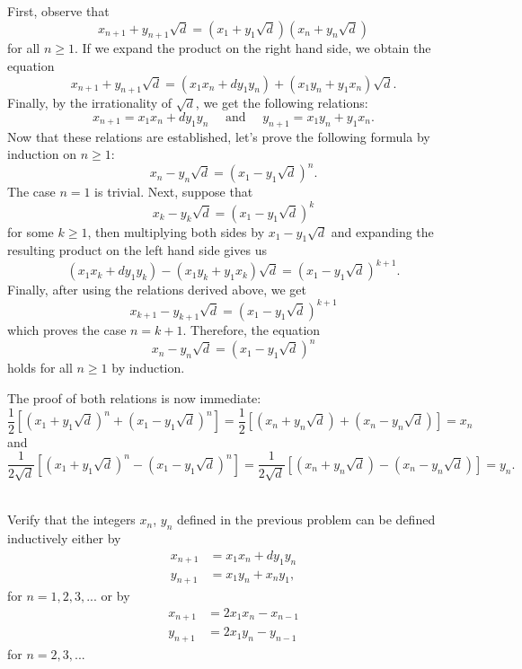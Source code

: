 \begin{solution}
    First, observe that
    $$x_{n+1} + y_{n+1}\sqrt{d} = (x_1 + y_1\sqrt{d})(x_n + y_n\sqrt{d})$$
    for all $n \geq 1$. If we expand the product on the right hand side, we obtain the equation
    $$x_{n+1} + y_{n+1}\sqrt{d} = (x_1x_n + dy_1y_n) + (x_1y_n + y_1x_n)\sqrt{d}.$$
    Finally, by the irrationality of $\sqrt{d}$, we get the following relations:
    $$x_{n+1} = x_1x_n + dy_1y_n \quad \text{ and } \quad y_{n+1} = x_1y_n + y_1x_n.$$
    Now that these relations are established, let's prove the following formula by induction on $n \geq 1$:
    $$x_n - y_n\sqrt{d} = (x_1 - y_1\sqrt{d})^n.$$
    The case $n = 1$ is trivial. Next, suppose that
    $$x_k - y_k\sqrt{d} = (x_1 - y_1\sqrt{d})^k$$
    for some $k \geq 1$, then multiplying both sides by $x_1 - y_1\sqrt{d}$ and expanding the resulting product on the left hand side gives us
    $$(x_1x_k + dy_1y_k) - (x_1y_k + y_1x_k)\sqrt{d} = (x_1 - y_1\sqrt{d})^{k+1}.$$
    Finally, after using the relations derived above, we get
    $$x_{k+1} - y_{k+1}\sqrt{d} = (x_1 - y_1\sqrt{d})^{k+1}$$
    which proves the case $n = k+1$. Therefore, the equation
    $$x_n - y_n\sqrt{d} = (x_1 - y_1\sqrt{d})^n$$
    holds for all $n \geq 1$ by induction.

    The proof of both relations is now immediate:
    $$\frac{1}{2}\left[(x_1 + y_1\sqrt{d})^n + (x_1 - y_1\sqrt{d})^n\right] = \frac{1}{2}\left[(x_n + y_n\sqrt{d}) + (x_n - y_n\sqrt{d})\right] = x_n$$
    and 
    $$\frac{1}{2\sqrt{d}}\left[(x_1 + y_1\sqrt{d})^n - (x_1 - y_1\sqrt{d})^n\right] = \frac{1}{2\sqrt{d}}\left[(x_n + y_n\sqrt{d}) - (x_n - y_n\sqrt{d})\right] = y_n.$$ \\
\end{solution}

\begin{exercise}
    Verify that the integers $x_n$, $y_n$ defined in the previous problem can be defined inductively either by
    \begin{align*}
        x_{n+1} &= x_1x_n + dy_1y_n \\
        y_{n+1} &= x_1y_n + x_ny_1,
    \end{align*}
    for $n = 1,2,3, ...$ or by 
    \begin{align*}
        x_{n+1} &= 2x_1x_n - x_{n-1} \\
        y_{n+1} &= 2x_1y_n - y_{n-1}
    \end{align*}
    for $n = 2,3, ...$\\
\end{exercise}

